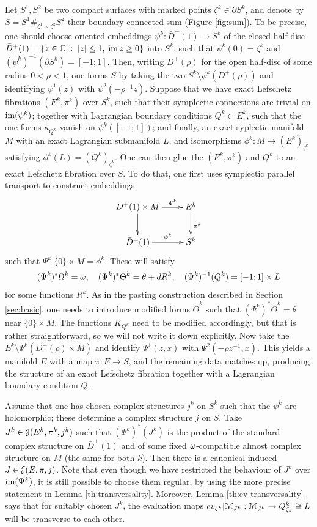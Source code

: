 \documentclass[10pt,letterpaper]{article}
\begin{document}
Let $S^1,S^2$ be two compact surfaces with marked points $\zeta^k \in \partial
S^k$, and denote by $S = S^1 \#_{\zeta^1 \sim \zeta^2} S^2$ their boundary
connected sum (Figure \ref{fig:sum}). To be precise, one should choose oriented
embeddings $\psi^k: \bar{D}^+(1) \rightarrow S^k$ of the closed half-disc
$\bar{D}^+(1) = \{z \in \mathbb{C} \; : \; |z| \leq 1, \;\mathrm{im}\,z \geq 0\}$ into $S^k$,
such that $\psi^k(0) = \zeta^k$ and $(\psi^k)^{-1}(\partial S^k) = [-1;1]$.
Then, writing $D^+(\rho)$ for the open half-disc of some radius $0<\rho<1$, one
forms $S$ by taking the two $S^k \setminus \psi^k(D^+(\rho))$ and identifying
$\psi^1(z)$ with $\psi^2(-\rho^{-1}z)$. Suppose that we have exact Lefschetz
fibrations $(E^k,\pi^k)$ over $S^k$, such that their symplectic connections are
trivial on $\mathrm{im}(\psi^k)$; together with Lagrangian boundary conditions $Q^k
\subset E^k$, such that the one-forms $\kappa_{Q^k}$ vanish on
$\psi^k([-1;1])$; and finally, an exact syplectic manifold $M$ with an exact
Lagrangian submanifold $L$, and isomorphisms $\phi^k: M \rightarrow
(E^k)_{\zeta^k}$ satisfying $\phi^k(L) = (Q^k)_{\zeta^k}$. One can then glue
the $(E^k,\pi^k)$ and $Q^k$ to an exact Lefschetz fibration over $S$. To do
that, one first uses symplectic parallel transport to construct embeddings
\[
\xymatrix{
 {\bar{D}^+(1) \times M} \ar[r]^-{\Psi^k} \ar[d] &
 {E^k} \ar[d]^{\pi^k} \\
 {\bar{D}^+(1)} \ar[r]^-{\psi^k} & {S^k}
}
\]
such that $\Psi^k|\{0\} \times M = \phi^k$. These will satisfy
\[
(\Psi^k)^*\Omega^k = \omega, \quad (\Psi^k)^*\Theta^k = \theta + dR^k, \quad
(\Psi^k)^{-1}(Q^k) = [-1;1] \times L
\]
for some functions $R^k$. As in the pasting construction described in Section
\ref{sec:basic}, one needs to introduce modified forms $\tilde{\Theta}^k$ such
that $(\Psi^k)^*\tilde{\Theta}^k = \theta$ near $\{0\} \times M$. The functions
$K_{Q^k}$ need to be modified accordingly, but that is rather straightforward,
so we will not write it down explicitly. Now take the $E^k \setminus
\Psi^k(D^+(\rho) \times M)$ and identify $\Psi^1(z,x)$ with $\Psi^2(-\rho
z^{-1},x)$. This yields a manifold $E$ with a map $\pi: E \rightarrow S$, and
the remaining data matches up, producing the structure of an exact Lefschetz
fibration together with a Lagrangian boundary condition $Q$.
%
%

Assume that one has chosen complex structures $j^k$ on $S^k$ such that the
$\psi^k$ are holomorphic; these determine a complex structure $j$ on $S$. Take
$J^k \in \mathcal{J}(E^k,\pi^k,j^k)$ such that $(\Psi^k)^*(J^k)$ is the product of the
standard complex structure on $\bar{D}^+(1)$ and of some fixed $\omega$-compatible
almost complex structure on $M$ (the same for both $k$). Then there is a
canonical induced $J \in \mathcal{J}(E,\pi,j)$. Note that even though we have
restricted the behaviour of $J^k$ over $\mathrm{im}(\Psi^k)$, it is still possible to
choose them regular, by using the more precise statement in Lemma
\ref{th:transversality}. Moreover, Lemma \ref{th:ev-transversality} says that
for suitably chosen $J^k$, the evaluation maps $ev_{\zeta^k} | \mathcal{M}_{J^k}:
\mathcal{M}_{J^k} \rightarrow Q^k_{\zeta_k} \cong L$ will be transverse to each other.
\end{document}
